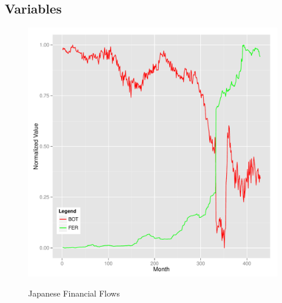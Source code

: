 \documentclass{sig-alternate-05-2015}
\begin{document}

\subsection{Variables}

\begin{figure}
\centering
\caption{Japanese Financial Flows}
\includegraphics[scale=0.45]{japan_plot.pdf}
\label{fig:japan}
\end{figure}
\end{document}
